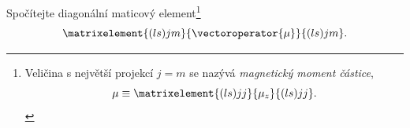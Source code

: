 \documentclass[a4paper,11pt,twoside]{book}
\begin{document}
	Spočítejte diagonální maticový element\footnote{
		Veličina s největší projekcí $j=m$ se nazývá \emph{magnetický moment částice},
		\begin{equation*}
			\mu\equiv\matrixelement{(ls)jj}{\mu_{z}}{(ls)jj}.
		\end{equation*}
	}
	\begin{equation*}
		\matrixelement{(ls)jm}{\vectoroperator{\mu}}{(ls)jm}.
	\end{equation*}
	    
\end{document}
